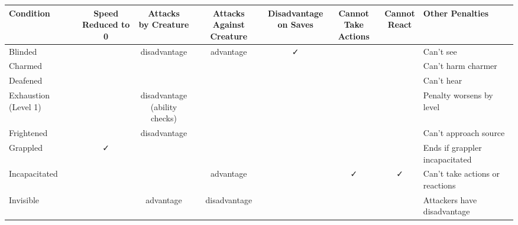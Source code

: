 \documentclass[12pt,letterpaper,landscape]{article}
\begin{document}
\renewcommand{\arraystretch}{1.5}
\setlength{\tabcolsep}{3pt}

\begin{table}[h!]
\centering
\begin{tabular}{@{}l c c c c c c l@{}}
\toprule
\textbf{Condition} & \parbox[t]{1.5cm}{\centering Speed \\ Reduced to 0} 
                   & \parbox[t]{2.5cm}{\centering Attacks \\ by Creature} 
                   & \parbox[t]{2.5cm}{\centering Attacks \\ Against Creature} 
                   & \parbox[t]{1.5cm}{\centering Disadvantage \\ on Saves} 
                   & \parbox[t]{1.5cm}{\centering Cannot \\ Take Actions} 
                   & \parbox[t]{1.5cm}{\centering Cannot \\ React} 
                   & \textbf{Other Penalties} \\ \midrule
{}
Blinded            &            & disadvantage   & advantage    & ✓          &               &               & Can't see \\ 
Charmed            &            &                &              &            &               &               & Can't harm charmer \\ 
Deafened           &            &                &              &            &               &               & Can't hear \\ 
Exhaustion (Level 1) &          & \parbox{2.5cm}{\centering disadvantage \\ (ability checks)} 
                                   &              &            &               &               & Penalty worsens by level \\ 
Frightened         &            & disadvantage   &              &            &               &               & Can't approach source \\ 
Grappled           & ✓          &                &              &            &               &               & Ends if grappler incapacitated \\ 
Incapacitated      &            &                & advantage    &            & ✓             & ✓             & Can't take actions or reactions \\ 
Invisible          &            & advantage      & disadvantage &            &               &               & Attackers have disadvantage \\ 

\end{tabular}
\end{table}
\end{document}
